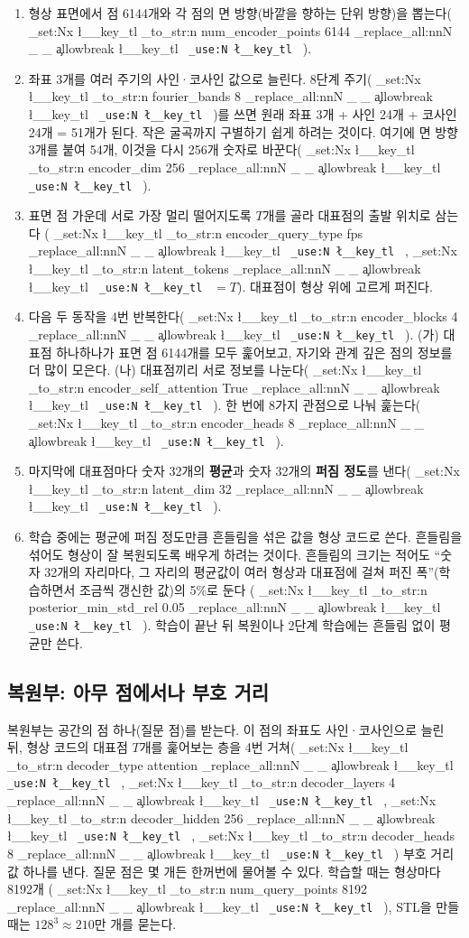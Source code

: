 \documentclass[11pt]{article}
\DeclareRobustCommand{\key}[1]{
  \tl_set:Nx \l__key_tl { \tl_to_str:n {#1} }
  \regex_replace_all:nnN { \_ } { \cO\_ \c{allowbreak} } \l__key_tl
  \texttt{ \tl_use:N \l__key_tl }
}
\begin{document}
\begin{enumerate}
\item 형상 표면에서 점 6144개와 각 점의 면 방향(바깥을 향하는 단위 방향)을 뽑는다(\key{num_encoder_points 6144}).
\item 좌표 3개를 여러 주기의 사인·코사인 값으로 늘린다. 8단계 주기(\key{fourier_bands 8})를 쓰면
원래 좌표 3개 + 사인 24개 + 코사인 24개 = 51개가 된다. 작은 굴곡까지 구별하기 쉽게 하려는 것이다.
여기에 면 방향 3개를 붙여 54개, 이것을 다시 256개 숫자로 바꾼다(\key{encoder_dim 256}).
\item 표면 점 가운데 서로 가장 멀리 떨어지도록 $T$개를 골라 대표점의 출발 위치로 삼는다
(\key{encoder_query_type fps}, \key{latent_tokens} $=T$). 대표점이 형상 위에 고르게 퍼진다.
\item 다음 두 동작을 4번 반복한다(\key{encoder_blocks 4}).
  (가) 대표점 하나하나가 표면 점 6144개를 모두 훑어보고, 자기와 관계 깊은 점의 정보를 더 많이 모은다.
  (나) 대표점끼리 서로 정보를 나눈다(\key{encoder_self_attention True}).
  한 번에 8가지 관점으로 나눠 훑는다(\key{encoder_heads 8}).
\item 마지막에 대표점마다 숫자 32개의 \textbf{평균}과 숫자 32개의 \textbf{퍼짐 정도}를 낸다(\key{latent_dim 32}).
\item 학습 중에는 평균에 퍼짐 정도만큼 흔들림을 섞은 값을 형상 코드로 쓴다. 흔들림을 섞어도 형상이 잘 복원되도록
배우게 하려는 것이다. 흔들림의 크기는 적어도 ``숫자 32개의 자리마다, 그 자리의 평균값이 여러 형상과 대표점에 걸쳐 퍼진 폭''(학습하면서 조금씩 갱신한 값)의 5\%로 둔다
(\key{posterior_min_std_rel 0.05}). 학습이 끝난 뒤 복원이나 2단계 학습에는 흔들림 없이 평균만 쓴다.
\end{enumerate}

\subsection{복원부: 아무 점에서나 부호 거리}

복원부는 공간의 점 하나(질문 점)를 받는다. 이 점의 좌표도 사인·코사인으로 늘린 뒤, 형상 코드의 대표점 $T$개를 훑어보는
층을 4번 거쳐(\key{decoder_type attention}, \key{decoder_layers 4}, \key{decoder_hidden 256}, \key{decoder_heads 8})
부호 거리 값 하나를 낸다. 질문 점은 몇 개든 한꺼번에 물어볼 수 있다. 학습할 때는 형상마다 8192개
(\key{num_query_points 8192}), STL을 만들 때는 $128^3\approx210$만 개를 묻는다.
\end{document}
